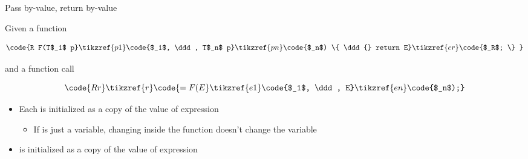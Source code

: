 \begin{frame}
\begin{columns}
  \end{columns}


\end{frame}

\begin{frame}{Pass by-value, return by-value}

  Given a function


  \begin{equation*}
    \code{R F(T$_1$ p}\tikzref{p1}\code{$_1$, \ddd, T$_n$ p}\tikzref{pn}\code{$_n$) \{ \ddd{} return E}\tikzref{er}\code{$_R$; \} }
  \end{equation*}

  and a function call

  \begin{equation*}
    \code{R r}\tikzref{r}\code{ = F(E}\tikzref{e1}\code{$_1$, \ddd, E}\tikzref{en}\code{$_n$);}
  \end{equation*}

  \begin{itemize}
  \item<2-> Each  is initialized as a \alert{copy} of the value of
    expression 
    \begin{itemize}
    \item If  is just a variable, changing  inside the
      function doesn't change the variable
    \end{itemize}
  \item<3->  is initialized as a \alert{copy} of the value of expression
  \end{itemize}


\end{frame}


